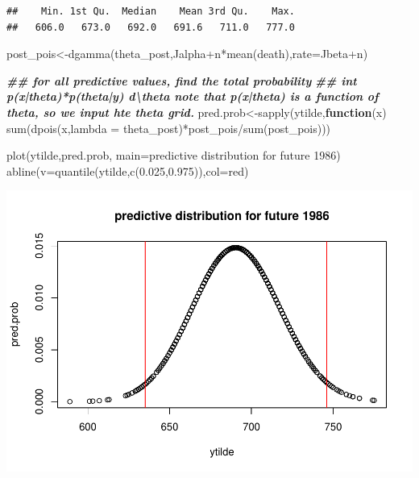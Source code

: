\documentclass[
]{book}
\newenvironment{Shaded}{\begin{snugshade}}{\end{snugshade}}
\newcommand{\AttributeTok}[1]{\textcolor[rgb]{0.77,0.63,0.00}{#1}}
\newcommand{\ControlFlowTok}[1]{\textcolor[rgb]{0.13,0.29,0.53}{\textbf{#1}}}
\newcommand{\DocumentationTok}[1]{\textcolor[rgb]{0.56,0.35,0.01}{\textbf{\textit{#1}}}}
\newcommand{\FloatTok}[1]{\textcolor[rgb]{0.00,0.00,0.81}{#1}}
\newcommand{\FunctionTok}[1]{\textcolor[rgb]{0.00,0.00,0.00}{#1}}
\newcommand{\NormalTok}[1]{#1}
\newcommand{\OtherTok}[1]{\textcolor[rgb]{0.56,0.35,0.01}{#1}}
\newcommand{\SpecialCharTok}[1]{\textcolor[rgb]{0.00,0.00,0.00}{#1}}
\newcommand{\StringTok}[1]{\textcolor[rgb]{0.31,0.60,0.02}{#1}}
\theoremstyle{definition}
\theoremstyle{definition}
\theoremstyle{definition}
\theoremstyle{definition}
\theoremstyle{remark}
\begin{document}
\begin{verbatim}
##    Min. 1st Qu.  Median    Mean 3rd Qu.    Max. 
##   606.0   673.0   692.0   691.6   711.0   777.0
\end{verbatim}

\begin{Shaded}
\begin{Highlighting}[]
\NormalTok{   post\_pois}\OtherTok{\textless{}{-}}\FunctionTok{dgamma}\NormalTok{(theta\_post,Jalpha}\SpecialCharTok{+}\NormalTok{n}\SpecialCharTok{*}\FunctionTok{mean}\NormalTok{(death),}\AttributeTok{rate=}\NormalTok{Jbeta}\SpecialCharTok{+}\NormalTok{n)}

\DocumentationTok{\#\# for all predictive values,  find the total probability  }
   \DocumentationTok{\#\# int p(x|theta)*p(theta|y) d\textbackslash{}theta  note that p(x|theta) is a function of theta, so we input hte theta grid.}
\NormalTok{ pred.prob}\OtherTok{\textless{}{-}}\FunctionTok{sapply}\NormalTok{(ytilde,}\ControlFlowTok{function}\NormalTok{(x) }\FunctionTok{sum}\NormalTok{(}\FunctionTok{dpois}\NormalTok{(x,}\AttributeTok{lambda =}\NormalTok{ theta\_post)}\SpecialCharTok{*}\NormalTok{post\_pois}\SpecialCharTok{/}\FunctionTok{sum}\NormalTok{(post\_pois)))  }
  
 \FunctionTok{plot}\NormalTok{(ytilde,pred.prob, }\AttributeTok{main=}\StringTok{\textquotesingle{}predictive distribution for future 1986\textquotesingle{}}\NormalTok{)}
 \FunctionTok{abline}\NormalTok{(}\AttributeTok{v=}\FunctionTok{quantile}\NormalTok{(ytilde,}\FunctionTok{c}\NormalTok{(}\FloatTok{0.025}\NormalTok{,}\FloatTok{0.975}\NormalTok{)),}\AttributeTok{col=}\StringTok{\textquotesingle{}red\textquotesingle{}}\NormalTok{)}
\end{Highlighting}
\end{Shaded}

\includegraphics{_main_files/figure-latex/unnamed-chunk-26-2.pdf}
\end{document}
